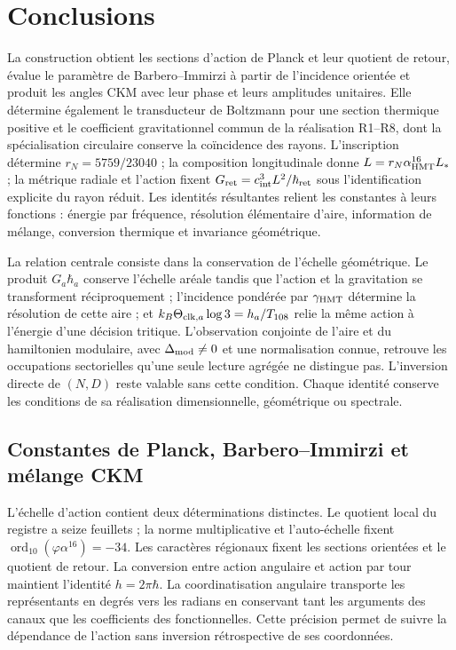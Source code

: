 \section{Conclusions}
\label{sec:ii-conclusiones}

La construction obtient les sections d’action de Planck et leur quotient
de retour, évalue le paramètre de Barbero--Immirzi à partir de l’incidence
orientée et produit les angles CKM avec leur phase et leurs amplitudes unitaires.
Elle détermine également le transducteur de Boltzmann pour une section thermique
positive et le coefficient gravitationnel commun de la réalisation R1--R8,
dont la spécialisation circulaire conserve la coïncidence des rayons.
L’inscription détermine \(r_N=5759/23040\) ; la composition longitudinale
donne \(L=r_N\alpha_{\mathrm{HMT}}^{16}L_*\) ; la métrique radiale et l’action
fixent \(G_{\rm ret}=c_{\rm int}^3L^2/\hbar_{\rm ret}\) sous
l’identification explicite du rayon réduit. Les identités résultantes relient les constantes
à leurs fonctions : énergie par fréquence, résolution élémentaire d’aire,
information de mélange, conversion thermique et invariance géométrique.

La relation centrale consiste dans la conservation de l’échelle géométrique.
Le produit \(G_a\hbar_a\) conserve l’échelle aréale tandis que l’action
et la gravitation se transforment réciproquement ; l’incidence pondérée
par \(\gamma_{\mathrm{HMT}}\) détermine la résolution de cette aire ; et
\(k_B\Theta_{{\rm clk},a}\log3=h_a/T_{108}\) relie la même action
à l’énergie d’une décision tritique. L’observation conjointe de l’aire
et du hamiltonien modulaire, avec \(\Delta_{\rm mod}\ne0\) et une
normalisation connue, retrouve les occupations sectorielles qu’une
seule lecture agrégée ne distingue pas. L’inversion directe de
\((N,D)\) reste valable sans cette condition. Chaque identité conserve les
conditions de sa réalisation dimensionnelle, géométrique ou spectrale.

\subsection{Constantes de Planck, Barbero--Immirzi et mélange CKM}

L’échelle d’action contient deux déterminations distinctes. Le
quotient local du registre a seize feuillets ; la norme multiplicative
et l’auto-échelle fixent \(\operatorname{ord}_{10}(\varphi\alpha^{16})=-34\). Les caractères régionaux fixent les sections orientées
et le quotient de retour. La conversion entre action angulaire et action
par tour maintient l’identité \(h=2\pi\hbar\). La coordinatisation angulaire
transporte les représentants en degrés vers les radians en conservant tant
les arguments des canaux que les coefficients des fonctionnelles.
Cette précision permet de suivre la dépendance de l’action sans
inversion rétrospective de ses coordonnées.

